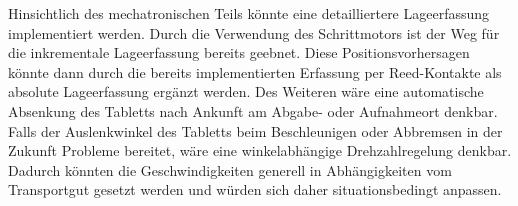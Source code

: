 Hinsichtlich des mechatronischen Teils könnte eine detailliertere Lageerfassung implementiert werden. Durch die Verwendung des Schrittmotors ist der Weg für die inkrementale Lageerfassung bereits geebnet. Diese Positionsvorhersagen könnte dann durch die bereits implementierten Erfassung per Reed-Kontakte als absolute Lageerfassung ergänzt werden. Des Weiteren wäre eine automatische Absenkung des Tabletts nach Ankunft am Abgabe- oder Aufnahmeort denkbar. Falls der Auslenkwinkel des Tabletts beim Beschleunigen oder Abbremsen in der Zukunft Probleme bereitet, wäre eine winkelabhängige Drehzahlregelung denkbar. Dadurch könnten die Geschwindigkeiten generell in Abhängigkeiten vom Transportgut gesetzt werden und würden sich daher situationsbedingt anpassen. 


